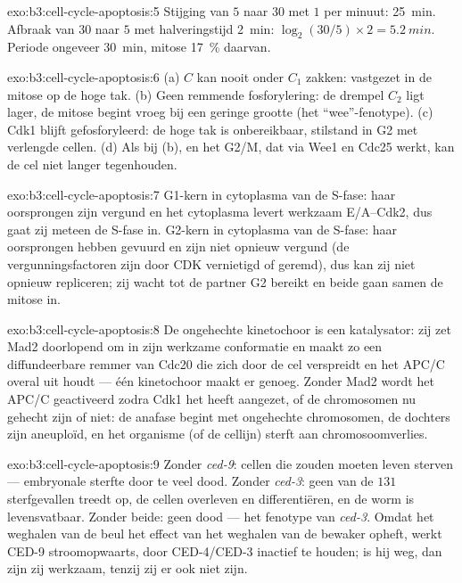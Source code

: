 \begin{solution}{exo:b3:cell-cycle-apoptosis:5}
Stijging van $5$ naar $30$ met $1$ per minuut: \qty{25}{min}. Afbraak van
$30$ naar $5$ met halveringstijd \qty{2}{min}: $\log_{2}(30/5)\times 2 =
\qty{5.2}{min}$. Periode ongeveer \qty{30}{min}, mitose \qty{17}{\%} daarvan.
\end{solution}

\begin{solution}{exo:b3:cell-cycle-apoptosis:6}
(a) $C$ kan nooit onder $C_{1}$ zakken: vastgezet in de mitose op de
hoge tak. (b) Geen remmende fosforylering: de drempel $C_{2}$ ligt
lager, de mitose begint vroeg bij een geringe grootte (het
``wee''-fenotype). (c) Cdk1 blijft gefosforyleerd: de hoge tak is
onbereikbaar, stilstand in G2 met verlengde cellen. (d) Als bij (b), en
het  G2/M, dat via Wee1 en Cdc25 werkt, kan de cel niet
langer tegenhouden.
\end{solution}

\begin{solution}{exo:b3:cell-cycle-apoptosis:7}
G1-kern in cytoplasma van de S-fase: haar oorsprongen zijn vergund en
het cytoplasma levert werkzaam  E/A--Cdk2, dus gaat zij meteen de
S-fase in. G2-kern in cytoplasma van de S-fase: haar oorsprongen hebben
gevuurd en zijn niet opnieuw vergund (de vergunningsfactoren zijn door
CDK vernietigd of geremd), dus kan zij niet opnieuw repliceren; zij
wacht tot de partner G2 bereikt en beide gaan samen de mitose in.
\end{solution}

\begin{solution}{exo:b3:cell-cycle-apoptosis:8}
De ongehechte kinetochoor is een katalysator: zij zet Mad2 doorlopend om
in zijn werkzame conformatie en maakt zo een diffundeerbare remmer van
Cdc20 die zich door de cel verspreidt en het APC/C overal uit houdt ---
één kinetochoor maakt er genoeg. Zonder Mad2 wordt het APC/C
geactiveerd zodra Cdk1 het heeft aangezet, of de chromosomen nu gehecht
zijn of niet: de anafase begint met ongehechte chromosomen, de dochters
zijn aneuploïd, en het organisme (of de cellijn) sterft aan
chromosoomverlies.
\end{solution}

\begin{solution}{exo:b3:cell-cycle-apoptosis:9}
Zonder \emph{ced-9}: cellen die zouden moeten leven sterven ---
embryonale sterfte door te veel dood. Zonder \emph{ced-3}: geen van de
$131$ sterfgevallen treedt op, de cellen overleven en differentiëren, en
de worm is levensvatbaar. Zonder beide: geen dood --- het fenotype van
\emph{ced-3}. Omdat het weghalen van de beul het effect van het
weghalen van de bewaker opheft, werkt CED-9 stroomopwaarts, door
CED-4/CED-3 inactief te houden; is hij weg, dan zijn zij werkzaam,
tenzij zij er ook niet zijn.
\end{solution}

